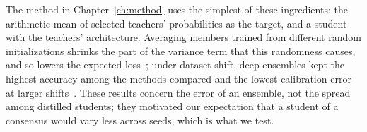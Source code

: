 The
method in Chapter~\ref{ch:method} uses the simplest of these
ingredients: the arithmetic mean of selected teachers' probabilities
as the target, and a student with the teachers' architecture.
Averaging members trained from different random initializations
shrinks the part of the variance term that this randomness causes, and
so lowers the expected
loss~\cite{lakshminarayanan2016simple,gruber2022uncertainty}; under
dataset shift, deep ensembles kept the highest accuracy among the
methods compared and the lowest calibration error at larger
shifts~\cite{ovadia2019trust}.
These
results concern the error of an ensemble, not the spread among
distilled students; they motivated our expectation that a student of a
consensus would vary less across seeds, which is what we test.

